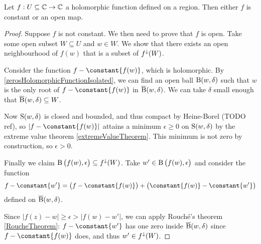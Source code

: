 \begin{theorem} \label{openMappingTheorem}
Let $f: U\subseteq \mathbb{C}\to \mathbb{C}$ a holomorphic function defined on a region. Then either $f$ is constant or an open map.
\end{theorem}
\begin{proof}
Suppose $f$ is not constant. We then need to prove that $f$ is open. Take some open subset $W\subseteq U$ and $w\in W$. We show that there exists an open neighbourhood of $f(w)$ that is a subset of $f^\downarrow(W)$.

Consider the function $f - \constant{f(w)}$, which is holomorphic.
By \ref{zerosHolomorphicFunctionIsolated}, we can find an open ball $\operatorname{B}(w, \delta)$ such that $w$ is the only root of $f - \constant{f(w)}$ in $\operatorname{\overline{B}}(w, \delta)$. We can take $\delta$ small enough that $\operatorname{\overline{B}}(w, \delta) \subseteq W$.

Now $\operatorname{S}(w,\delta)$ is closed and bounded, and thus compact by Heine-Borel (TODO ref), so $|f - \constant{f(w)}|$ attains a minimum $\epsilon \geq 0$ on $\operatorname{S}(w,\delta)$ by the extreme value theorem \ref{extremeValueTheorem}. This minimum is not zero by construction, so $\epsilon > 0$.

Finally we claim $\operatorname{B}\big(f(w), \epsilon\big) \subseteq f^\downarrow(W)$. Take $w'\in \operatorname{B}\big(f(w), \epsilon\big)$ and consider the function
\[ f - \constant{w'} = \big(f - \constant{f(w)}\big) + \big(\constant{f(w)} - \constant{w'}\big) \]
defined on $\operatorname{\overline{B}}(w, \delta)$.

Since $\big|f(z) - w\big| \geq \epsilon > \big|f(w) - w'\big|$, we can apply Rouché's theorem \ref{RoucheTheorem}: $f - \constant{w'}$ has one zero inside $\operatorname{\overline{B}}(w,\delta)$ since $f - \constant{f(w)}$ does, and thus $w'\in f^\downarrow(W)$.
\end{proof}


